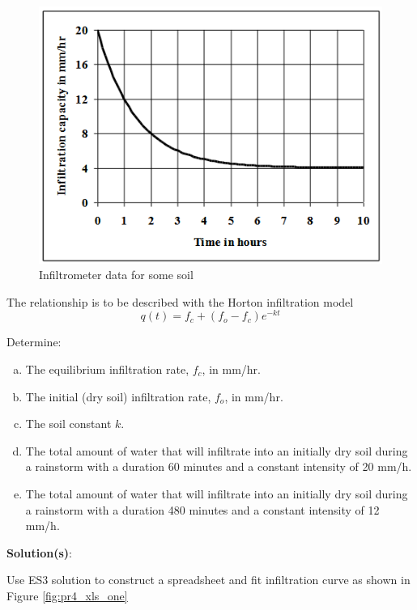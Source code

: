 \documentclass[12pt]{article}
\begin{document}
\begin{enumerate}
\begin{figure}[h!] %
   \centering
   \includegraphics[width=5in]{INFIL.png} 
   \caption{Infiltrometer data for some soil}
   \label{fig:INFIL}
\end{figure}

The relationship is to be described with the Horton infiltration model 
\begin{equation}
q(t)=f_c+(f_o-f_c)e^{-kt}
\end{equation}

Determine:
    \begin{enumerate}[a)]
        \item The equilibrium infiltration rate, $f_c$, in mm/hr.
        \item The initial (dry soil) infiltration rate, $f_o$, in mm/hr.
        \item The soil constant $k$.
        \item The total amount of water that will infiltrate into an initially dry soil during a rainstorm with a duration 60 minutes and a constant intensity of 20 mm/h.
        \item The total amount of water that will infiltrate into an initially dry soil during a rainstorm with a duration 480 minutes and a constant intensity of 12 mm/h.
    \end{enumerate}

\textbf{Solution(s)}:

Use ES3 solution to construct a spreadsheet and fit infiltration curve as shown in Figure \ref{fig:pr4_xls_one}


\end{enumerate}
\end{document}
